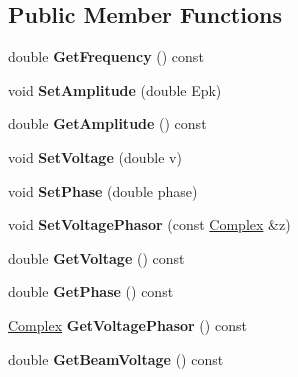 \subsection*{Public Member Functions}
\begin{DoxyCompactItemize}
\item 
\mbox{\label{classRFStructure_a1852d0b24be68eaedf39208d4f1cf915}} 
double {\bfseries Get\+Frequency} () const
\item 
\mbox{\label{classRFStructure_a442e494bea6d7f752c4c743aae737385}} 
void {\bfseries Set\+Amplitude} (double Epk)
\item 
\mbox{\label{classRFStructure_af6465b8169e40df7f081f9f668b915b2}} 
double {\bfseries Get\+Amplitude} () const
\item 
\mbox{\label{classRFStructure_a65333944ca4cdc3f5ffa8e6bdfa834db}} 
void {\bfseries Set\+Voltage} (double v)
\item 
\mbox{\label{classRFStructure_aa0d1024a798c27a12c1e11b3ad124000}} 
void {\bfseries Set\+Phase} (double phase)
\item 
\mbox{\label{classRFStructure_af5a05a50391704d94268f836458c97d2}} 
void {\bfseries Set\+Voltage\+Phasor} (const \hyperlink{classComplex}{Complex} \&z)
\item 
\mbox{\label{classRFStructure_a14a04cdb8fc44a860257e00cbd2d3a83}} 
double {\bfseries Get\+Voltage} () const
\item 
\mbox{\label{classRFStructure_a6b42204007f9552377dfb93fd595eb31}} 
double {\bfseries Get\+Phase} () const
\item 
\mbox{\label{classRFStructure_aabfffa7bb59404e8fba45ade1160f158}} 
\hyperlink{classComplex}{Complex} {\bfseries Get\+Voltage\+Phasor} () const
\item 
\mbox{\label{classRFStructure_af06f8eacb495d71cc8adc404c835f7b2}} 
double {\bfseries Get\+Beam\+Voltage} () const
\item 
\mbox{\label{classRFStructure_a51457c1f02f8c08f908033be5ed99bda}} 

\end{DoxyCompactItemize}
